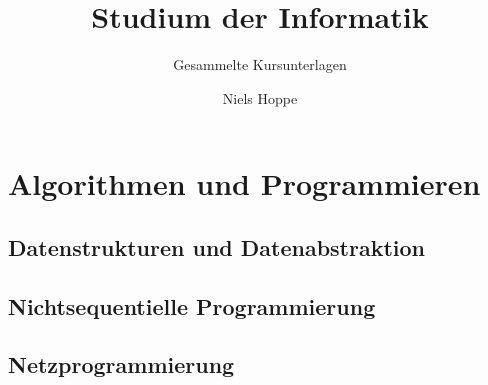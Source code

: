 

\title{Studium der Informatik}
\subtitle{Gesammelte Kursunterlagen}
\author{Niels Hoppe}



\maketitle
\tableofcontents

\part{Algorithmen und Programmieren}
\chapter{Datenstrukturen und Datenabstraktion}

\chapter{Nichtsequentielle Programmierung}
\chapter{Netzprogrammierung}


